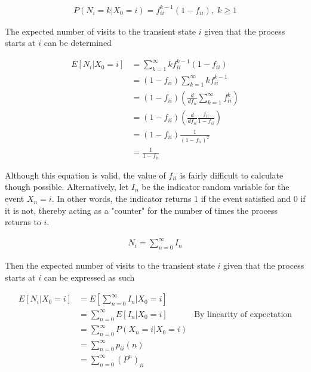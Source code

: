 \documentclass[a4paper,12pt]{article}
\theoremstyle{definition}
\begin{document}
	\begin{equation*}
	\begin{aligned}
		 P(N_i = k | X_0 = i) = f_{ii}^{k-1}(1-f_{ii}), \; k\geq1
	\end{aligned}
	\end{equation*}		
	
	The expected number of visits to the transient state $i$ given that the process starts at $i$ can be determined
	
	\begin{equation*}
		\begin{aligned}
			E[N_i|X_0 = i] &= \sum_{k=1}^\infty kf_{ii}^{k-1}(1-f_{ii}) \\
							&= (1-f_{ii})\sum_{k=1}^\infty kf_{ii}^{k-1} \\
							&= (1-f_{ii}) (\frac{d}{df_{ii}} \sum_{k=1}^\infty f_{ii}^{k}) \\
							&= (1-f_{ii}) (\frac{d}{df_{ii}} \frac{f_{ii}}{1-f_{ii}}) \\
							&= (1-f_{ii}) \frac{1}{(1-f_{ii})^2} \\
							&= \frac{1}{1-f_{ii}}\
		\end{aligned}
	\end{equation*}	
	
	Although this equation is valid, the value of $f_{ii}$ is fairly difficult to calculate though possible. Alternatively, let $I_n$ be the indicator random variable for the event $X_n=i$. In other words, the indicator returns 1 if the event satisfied and 0 if it is not, thereby acting as a "counter" for the number of times the process returns to $i$.
	
	\begin{equation*}
	\begin{aligned}
		 N_i = \sum_{n=0}^\infty I_n
	\end{aligned}
	\end{equation*}	
	
	 Then the expected number of visits to the transient state $i$ given that the process starts at $i$ can be expressed as such
	
	\begin{equation*}
	\begin{aligned}
		 E[N_i|X_0 = i] &= E\left[\sum_{n=0}^\infty I_n | X_0 = i\right] \\
		 				  &= \sum_{n=0}^\infty E\left[I_n | X_0 = i\right] &\text{By linearity of expectation}\\
		 				  &= \sum_{n=0}^\infty P(X_n = i | X_0 = i) \\
		 				  &= \sum_{n=0}^\infty p_{ii}(n) \\
		 				  &= \sum_{n=0}^\infty (P^n)_{ii}
	\end{aligned}
	\end{equation*}	
	
\end{document}
